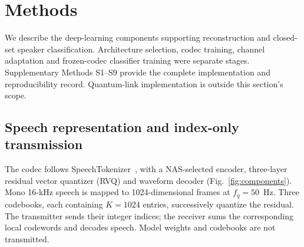 \documentclass[final,5p,times,twocolumn]{elsarticle}
\begin{document}
\section{Methods}
\label{sec:methods}
We describe the deep-learning components supporting reconstruction and closed-set speaker classification. Architecture selection, codec training, channel adaptation and frozen-codec classifier training were separate stages. Supplementary Methods S1--S9 provide the complete implementation and reproducibility record. Quantum-link implementation is outside this section's scope.

\subsection{Speech representation and index-only transmission}
The codec follows SpeechTokenizer~\cite{speechtokenizer}, with a NAS-selected encoder, three-layer residual vector quantizer (RVQ) and waveform decoder (Fig.~\ref{fig:components}). Mono 16-kHz speech is mapped to 1024-dimensional frames at $f_q=50$~Hz. Three codebooks, each containing $K=1024$ entries, successively quantize the residual. The transmitter sends their integer indices; the receiver sums the corresponding local codewords and decodes speech. Model weights and codebooks are not transmitted.
\end{document}
